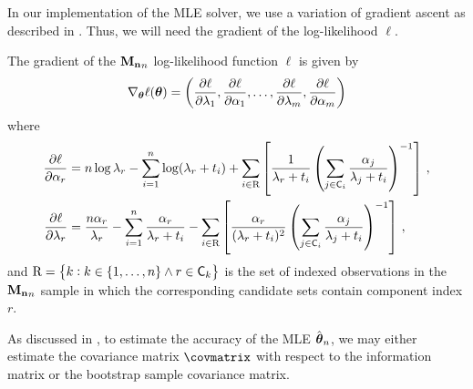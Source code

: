 \documentclass[
    11pt,
    extrafontsizes,
    article,
    oldfontcommands,
    final,
    oneside,
    openany,
    hidelinks]{memoir}
\begin{document}
In our implementation of the MLE solver, we use a variation of gradient ascent as described in . Thus, we will need the gradient of the log-likelihood $\ell$.
\begin{corollary*}
\label{cor:par_log_like_grad}
The gradient of the $\boldsymbol{\mathbf{M_n}}_n$ log-likelihood function $\ell$ is given by
\begin{equation}
    \nabla_{\boldsymbol{\mathbf{\theta}}} \ell(\boldsymbol{\mathbf{\theta}}) = \left (
        \frac {\mathrm{\partial} \ell}{\mathrm{\partial}\lambda_1},
        \frac {\mathrm{\partial} \ell}{\mathrm{\partial}\alpha_1},
        \ldots,
        \frac {\mathrm{\partial} \ell}{\mathrm{\partial}\lambda_m},
        \frac {\mathrm{\partial} \ell}{\mathrm{\partial}\alpha_m}
    \right )
\end{equation}
where
\begin{align}
    \ppderivative{\ell}{\alpha_r} &=
        n \log \lambda_r -
        \sum_{i=1}^{n} \log(\lambda_r + t_i) +
        \sum_{i \in \mathrm{R}} \left [
            \frac{1}{\lambda_r + t_i} 
            \left (
                \sum_{j \in \cand_i} \frac{\alpha_j}{\lambda_j + t_i}
            \right )^{-1}
        \right ]\,,\\
    \ppderivative{\ell}{\lambda_r} &=
        \frac{n \alpha_r}{\lambda_r} -
        \sum_{i=1}^{n} \frac{\alpha_r}{\lambda_r + t_i} -
        \sum_{i \in \mathrm{R}} \left [
            \frac{\alpha_r}{(\lambda_r + t_i)^2}
            \left (
                \sum_{j \in \cand_i} \frac{\alpha_j}{\lambda_j + t_i}
            \right)^{-1}
        \right ]\,,
\end{align}
and $\mathrm{R} = \left \{ k : k \in \{1, \ldots, n \} \wedge r \in \cand_k \right \}$ is the set of indexed observations in the $\boldsymbol{\mathbf{M_n}}_n$ sample in which the corresponding candidate sets contain component index $r$.
\end{corollary*}

As discussed in , to estimate the accuracy of the MLE $\hat{\boldsymbol{\mathbf{\theta}}}_n$, we may either estimate the covariance matrix $\covmatrix$ with respect to the information matrix or the bootstrap sample covariance matrix.
\end{document}
